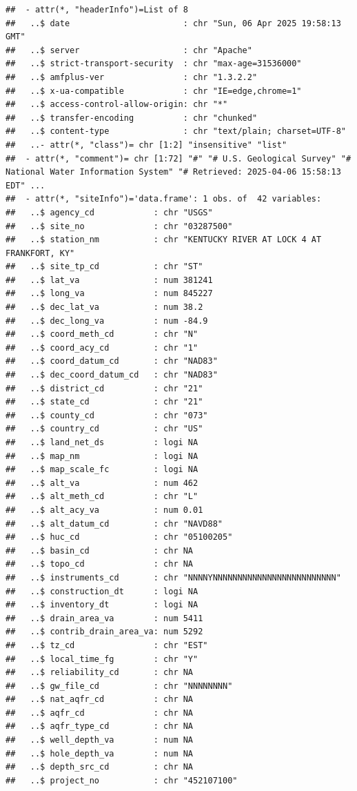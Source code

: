 \documentclass{tufte-handout}\usepackage[]{graphicx}\usepackage[]{xcolor}
\makeatletter
\newenvironment{kframe}{%
 \def\at@end@of@kframe{}%
 \ifinner\ifhmode%
  \def\at@end@of@kframe{\end{minipage}}%
  \begin{minipage}{\columnwidth}%
 \fi\fi%
 \def\FrameCommand##1{\hskip\@totalleftmargin \hskip-\fboxsep
 \colorbox{shadecolor}{##1}\hskip-\fboxsep
     \hskip-\linewidth \hskip-\@totalleftmargin \hskip\columnwidth}%
 \MakeFramed {\advance\hsize-\width
   \@totalleftmargin\z@ \linewidth\hsize
   \@setminipage}}%
 {\par\unskip\endMakeFramed%
 \at@end@of@kframe}
\newenvironment{knitrout}{}{} %
\makeatother
\begin{document}
\begin{knitrout}
\begin{kframe}
\begin{verbatim}
##  - attr(*, "headerInfo")=List of 8
##   ..$ date                       : chr "Sun, 06 Apr 2025 19:58:13 GMT"
##   ..$ server                     : chr "Apache"
##   ..$ strict-transport-security  : chr "max-age=31536000"
##   ..$ amfplus-ver                : chr "1.3.2.2"
##   ..$ x-ua-compatible            : chr "IE=edge,chrome=1"
##   ..$ access-control-allow-origin: chr "*"
##   ..$ transfer-encoding          : chr "chunked"
##   ..$ content-type               : chr "text/plain; charset=UTF-8"
##   ..- attr(*, "class")= chr [1:2] "insensitive" "list"
##  - attr(*, "comment")= chr [1:72] "#" "# U.S. Geological Survey" "# National Water Information System" "# Retrieved: 2025-04-06 15:58:13 EDT" ...
##  - attr(*, "siteInfo")='data.frame':	1 obs. of  42 variables:
##   ..$ agency_cd            : chr "USGS"
##   ..$ site_no              : chr "03287500"
##   ..$ station_nm           : chr "KENTUCKY RIVER AT LOCK 4 AT FRANKFORT, KY"
##   ..$ site_tp_cd           : chr "ST"
##   ..$ lat_va               : num 381241
##   ..$ long_va              : num 845227
##   ..$ dec_lat_va           : num 38.2
##   ..$ dec_long_va          : num -84.9
##   ..$ coord_meth_cd        : chr "N"
##   ..$ coord_acy_cd         : chr "1"
##   ..$ coord_datum_cd       : chr "NAD83"
##   ..$ dec_coord_datum_cd   : chr "NAD83"
##   ..$ district_cd          : chr "21"
##   ..$ state_cd             : chr "21"
##   ..$ county_cd            : chr "073"
##   ..$ country_cd           : chr "US"
##   ..$ land_net_ds          : logi NA
##   ..$ map_nm               : logi NA
##   ..$ map_scale_fc         : logi NA
##   ..$ alt_va               : num 462
##   ..$ alt_meth_cd          : chr "L"
##   ..$ alt_acy_va           : num 0.01
##   ..$ alt_datum_cd         : chr "NAVD88"
##   ..$ huc_cd               : chr "05100205"
##   ..$ basin_cd             : chr NA
##   ..$ topo_cd              : chr NA
##   ..$ instruments_cd       : chr "NNNNYNNNNNNNNNNNNNNNNNNNNNNNNN"
##   ..$ construction_dt      : logi NA
##   ..$ inventory_dt         : logi NA
##   ..$ drain_area_va        : num 5411
##   ..$ contrib_drain_area_va: num 5292
##   ..$ tz_cd                : chr "EST"
##   ..$ local_time_fg        : chr "Y"
##   ..$ reliability_cd       : chr NA
##   ..$ gw_file_cd           : chr "NNNNNNNN"
##   ..$ nat_aqfr_cd          : chr NA
##   ..$ aqfr_cd              : chr NA
##   ..$ aqfr_type_cd         : chr NA
##   ..$ well_depth_va        : num NA
##   ..$ hole_depth_va        : num NA
##   ..$ depth_src_cd         : chr NA
##   ..$ project_no           : chr "452107100"
\end{verbatim}
\end{kframe}
\end{knitrout}
\end{document}
